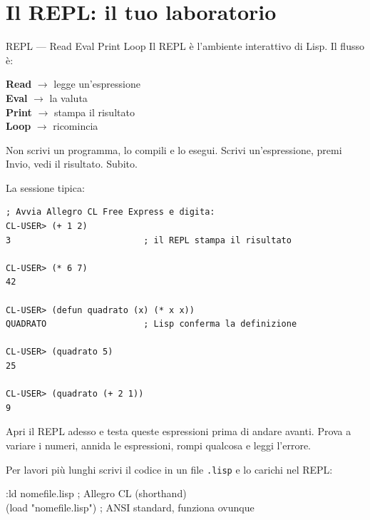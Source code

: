 \section{Il REPL: il tuo laboratorio}

\begin{concetto}{REPL — Read Eval Print Loop}
Il REPL è l'ambiente interattivo di Lisp. Il flusso è:

\medskip
\begin{center}
\textbf{Read} $\to$ legge un'espressione\\[3pt]
\textbf{Eval} $\to$ la valuta\\[3pt]
\textbf{Print} $\to$ stampa il risultato\\[3pt]
\textbf{Loop} $\to$ ricomincia
\end{center}

\medskip
Non scrivi un programma, lo compili e lo esegui. Scrivi
un'espressione, premi Invio, vedi il risultato. Subito.
\end{concetto}


La sessione tipica:

\begin{esempio}
\begin{lstlisting}
; Avvia Allegro CL Free Express e digita:
CL-USER> (+ 1 2)
3                          ; il REPL stampa il risultato

CL-USER> (* 6 7)
42

CL-USER> (defun quadrato (x) (* x x))
QUADRATO                   ; Lisp conferma la definizione

CL-USER> (quadrato 5)
25

CL-USER> (quadrato (+ 2 1))
9
\end{lstlisting}
\end{esempio}

\begin{workbook}
Apri il REPL adesso e testa queste espressioni prima di andare avanti.
Prova a variare i numeri, annida le espressioni, rompi qualcosa e leggi
l'errore.
\end{workbook}


Per lavori più lunghi scrivi il codice in un file \texttt{.lisp}
e lo carichi nel REPL:

\begin{sintassi}
:ld nomefile.lisp    ; Allegro CL (shorthand)\\
(load "nomefile.lisp")  ; ANSI standard, funziona ovunque
\end{sintassi}

